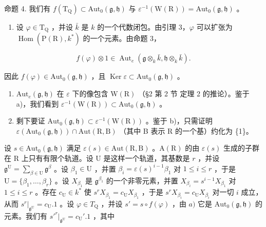 命题 4. 我们有 \(f(\mathrm{T}_{\mathrm{Q}}) \subset \mathrm{Aut}_0(\mathfrak{g}, \mathfrak{h})\) 与 \(\varepsilon^{-1}(\mathrm{W}(\mathrm{R})) = \mathrm{Aut}_0(\mathfrak{g}, \mathfrak{h})\) 。

\begin{enumerate}
\def\labelenumi{\alph{enumi})}
\tightlist
\item
  设 \(\varphi \in \mathrm{T}_{\mathrm{Q}}\) ，并设 \(\bar{k}\) 是 \(k\) 的一个代数闭包。由引理 3，\(\varphi\) 可以扩张为 \(\operatorname{Hom}(\mathrm{P}(\mathrm{R}), k^*)\) 的一个元素。由命题 3，
\end{enumerate}

\[
f (\varphi) \otimes 1 \in \operatorname{Aut} _ {e} (\mathfrak {g} \otimes_ {k} \bar {k}, \mathfrak {h} \otimes_ {k} \bar {k}).
\]

因此 \(f(\varphi) \in \mathrm{Aut}_0(\mathfrak{g},\mathfrak{h})\) ，且 \(\operatorname{Ker} \varepsilon \subset \mathrm{Aut}_0(\mathfrak{g},\mathfrak{h})\) 。

\begin{enumerate}
\def\labelenumi{\alph{enumi})}
\setcounter{enumi}{1}
\item
  \(\mathrm{Aut}_e(\mathfrak{g},\mathfrak{h})\) 在 \(\varepsilon\) 下的像包含 \(\mathrm{W(R)}\) （§2 第 2 节 定理 2 的推论）。鉴于 a)，我们看到 \(\varepsilon^{-1}(\mathrm{W(R)})\subset \mathrm{Aut}_0(\mathfrak{g},\mathfrak{h})\) 。
\item
  剩下要证 \(\mathrm{Aut}_0(\mathfrak{g},\mathfrak{h})\subset \varepsilon^{-1}(\mathrm{W}(\mathrm{R}))\) 。鉴于 b)，只需证明 \(\varepsilon (\mathrm{Aut}_0(\mathfrak{g},\mathfrak{h}))\cap \mathrm{Aut}(\mathrm{R},\mathrm{B})\) （其中 B 表示 R 的一个基）约化为 \{1\}。
\end{enumerate}

设 \(s \in \mathrm{Aut}_0(\mathfrak{g}, \mathfrak{h})\) 满足 \(\varepsilon(s) \in \mathrm{Aut}(\mathrm{R}, \mathrm{B})\) 。\(\mathrm{A}(\mathrm{R})\) 的由 \(\varepsilon(s)\) 生成的子群在 \(\mathrm{R}\) 上只有有限个轨道。设 \(\mathrm{U}\) 是这样一个轨道，其基数是 \(r\) ，并设 \(\mathfrak{g}^{\mathrm{U}} = \sum_{\beta \in \mathrm{U}} \mathfrak{g}^{\beta}\) 。设 \(\beta_1 \in \mathrm{U}\) ，并置 \(\beta_i = \varepsilon(s)^{i-1}\beta_1\) 对 \(1 \leq i \leq r\) ，于是 \(\mathrm{U} = \{\beta_1, \ldots, \beta_r\}\) 。设 \(X_{\beta_1}\) 是 \(\mathfrak{g}^{\beta_1}\) 的一个非零元素，并置 \(X_{\beta_i} = s^{i-1}X_{\beta_1}\) 对 \(1 \leq i \leq r\) 。存在 \(c_{\mathrm{U}} \in k^*\) 使 \(s^r X_{\beta_1} = c_{\mathrm{U}}X_{\beta_1}\) ，于是 \(s^r X_{\beta_i} = c_{\mathrm{U}}X_{\beta_i}\) 对一切 \(i\) 成立，从而 \(s^r |_{\mathfrak{g}^{\mathrm{U}}} = c_{\mathrm{U}}.1\) 。设 \(\varphi \in T_{\mathrm{Q}}\) ，并设 \(s' = s \circ f(\varphi)\) ，由 \(a)\) 它是 \(\mathrm{Aut}_0(\mathfrak{g}, \mathfrak{h})\) 的元素。我们有 \(s'^r |_{\mathfrak{g}^{\mathrm{U}}} = c_{\mathrm{U}}'.1\) ，其中

